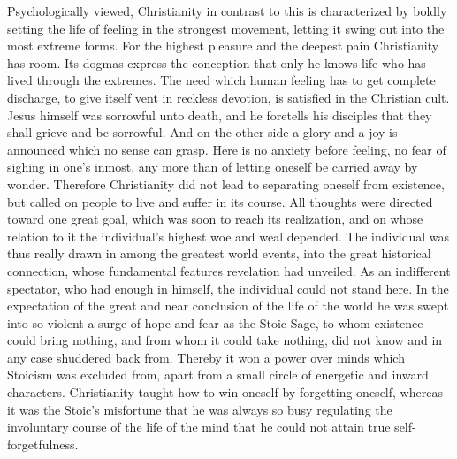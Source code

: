 \documentclass[12pt,a4paper,openany]{book}
\begin{document}
Psychologically viewed, Christianity in contrast to this is
characterized by boldly setting the life of feeling in the
strongest movement, letting it swing out into the most extreme
forms. For the highest pleasure and the deepest pain
Christianity has room. Its dogmas express the
conception that only he knows life who has lived through
the extremes. The need which human feeling
has to get complete discharge, to give itself vent
in reckless devotion, is satisfied in the Christian cult.
Jesus himself was sorrowful unto death, and he foretells his
disciples that they shall grieve and be sorrowful. And on the other
side a glory and a joy is announced which no sense
can grasp. Here is no anxiety before feeling, no
fear of sighing in one's inmost, any more than of letting
oneself be carried away by wonder. Therefore Christianity did not lead
to separating oneself from existence, but called on people to
live and suffer in its course. All thoughts were directed toward
one great goal, which was soon to reach its realization, and
on whose relation to it the individual's highest woe and weal
depended. The individual was thus really drawn in
among the greatest world events, into the great historical
connection, whose fundamental features revelation had unveiled.
As an indifferent spectator, who had enough in himself, the
individual could not stand here. In the expectation of the great
and near conclusion of the life of the world he was swept into so
violent a surge of hope and fear as the Stoic
Sage, to whom existence could bring nothing, and from whom
it could take nothing, did not know and in any case shuddered
back from. Thereby it won a power over minds which
Stoicism was excluded from, apart from a small circle of
energetic and inward characters. Christianity taught how to
win oneself by forgetting oneself, whereas it was
the Stoic's misfortune that he was always so busy
regulating the involuntary course of the life of the mind that he could not
attain true self-forgetfulness.
\end{document}
